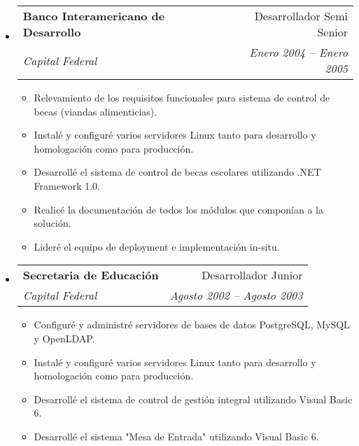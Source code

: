 \documentclass[a4paper,11pt]{article}
\makeatletter
\newcommand{\resitem}[1]{\item #1 \vspace{-2pt}}
\newcommand{\ressubheading}[4]{
\begin{tabular*}{6.3in}{l@{\extracolsep{\fill}}r}
		\textbf{#1} & #2 \\
		\textit{#3} & \textit{#4} \\
\end{tabular*}\vspace{-6pt}}
\makeatother
\begin{document}
\begin{itemize}
{\begin{itemize}
						\resitem{ Instal\'e y configur\'e varios de los servidores Linux y MySQL utilizados. }
						\resitem{ Escrib\'i la documentaci\'on t\'ecnica de los desarrollos realizados. }
					\end{itemize}
          		}
		\item
			\ressubheading{ Banco Interamericano de Desarrollo } { Desarrollador Semi Senior } { Capital Federal } { Enero 2004 -- Enero 2005 }
				{ \footnotesize
					\begin{itemize}
						\resitem{ Relevamiento de los requisitos funcionales para sistema de control de becas (viandas alimenticias). }
						\resitem{ Instal\'e y configur\'e varios servidores Linux tanto para desarrollo y homologaci\'on como para producci\'on. }
						\resitem{ Desarroll\'e el sistema de control de becas escolares utilizando .NET Framework 1.0. }
						\resitem{ Realic\'e la documentaci\'on de todos los m\'odulos que compon\'ian a la soluci\'on. }
						\resitem{ Lider\'e el equipo de deployment e implementaci\'on in-situ. }
					\end{itemize}
          		}
        \item
			\ressubheading{ Secretaria de Educaci\'on } { Desarrollador Junior } { Capital Federal } { Agosto 2002 -- Agosto 2003 }
				{ \footnotesize
					\begin{itemize}
						\resitem{ Configur\'e y administr\'e servidores de bases de datos PostgreSQL, MySQL y OpenLDAP. }
						\resitem{ Instal\'e y configur\'e varios servidores Linux tanto para desarrollo y homologaci\'on como para producci\'on. }
						\resitem{ Desarroll\'e el sistema de control de gesti\'on integral utilizando Visual Basic 6. }
						\resitem{ Desarroll\'e el sistema "Mesa de Entrada" utilizando Visual Basic 6. }
					\end{itemize}
          		}
	\end{itemize}

\end{document}
